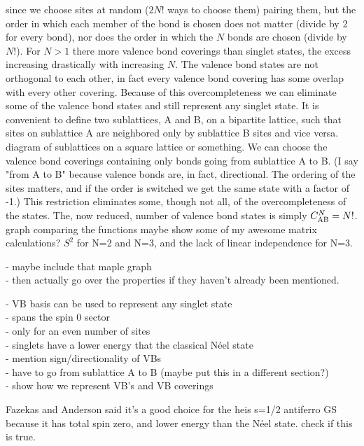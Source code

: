 since we choose sites at random ($2N!$ ways to choose them) pairing them, but the order 
in which each member of the bond is chosen does not matter (divide by 2 for every bond), 
nor does the order in which the $N$ bonds are chosen (divide by $N!$).
For $N>1$ there more valence bond coverings than singlet states, the excess increasing 
drastically with increasing $N$.  
The valence bond states are not orthogonal to each other, in fact every valence bond covering
has some overlap with every other covering.
Because of this overcompleteness we can eliminate some of the valence bond states and still
represent any singlet state.
It is convenient to define two sublattices, A and B, on a bipartite lattice, such that sites on 
sublattice A are neighbored only by sublattice B sites and vice versa. 
{\color{red} diagram of sublattices on a square lattice or something.}
We can choose the valence bond coverings containing only bonds going from sublattice A
to B.  (I say "from A to B" because valence bonds are, in fact, directional.  The ordering of the
sites matters, and if the order is switched we get the same state with a factor of -1.)
This restriction eliminates some, though not all, of the overcompleteness of the states.
The, now reduced, number of valence bond states is simply $C_{\rm{AB}}^N = N!$.
{\color{red} graph comparing the functions}
{\color{red} maybe show some of my awesome matrix calculations? $S^2$ for N=2 and N=3, and 
the lack of linear independence for N=3.}

{\color{red}
- maybe include that maple graph\\
- then actually go over the properties if they haven't already been mentioned.

- VB basis can be used to represent any singlet state\\
- spans the spin 0 sector\\
- only for an even number of sites\\
- singlets have a lower energy that the classical N\'eel state\\
- mention sign/directionality of VBs\\
- have to go from sublattice A to B (maybe put this in a different section?)\\
- show how we represent VB's and VB coverings
}

{\color{red} Fazekas and Anderson said it's a good choice for the heis s=1/2 antiferro GS
because it has total spin zero, and lower energy than the N\'eel state.  check if this is true.}

